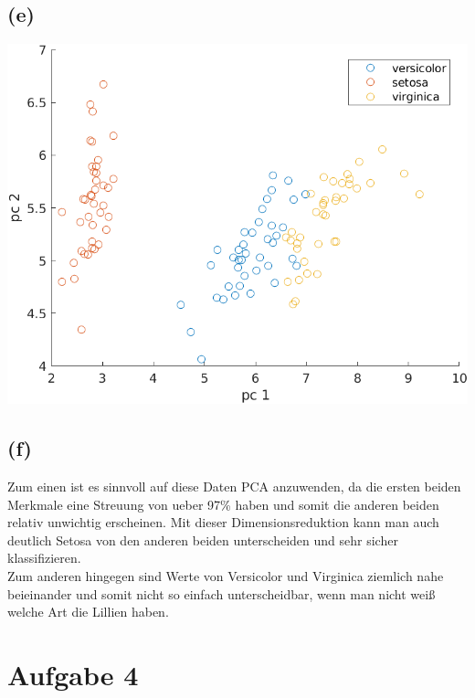 \documentclass[a4paper]{scrartcl}
\begin{document}
\subsection*{(e)}
\begin{center}
	\includegraphics*[scale = 0.75]{assignment4_data/plots/q3_e.png}
\end{center}

\subsection*{(f)}
Zum einen ist es sinnvoll auf diese Daten PCA anzuwenden, da die ersten beiden Merkmale eine Streuung von ueber 97\% haben und somit die anderen beiden relativ unwichtig erscheinen. Mit dieser Dimensionsreduktion kann man auch deutlich Setosa von den anderen beiden unterscheiden und sehr sicher klassifizieren.\\
Zum anderen hingegen sind Werte von Versicolor und Virginica ziemlich nahe beieinander und somit nicht so einfach unterscheidbar, wenn man nicht weiß welche Art die Lillien haben.







\section*{Aufgabe 4}
\end{document}
